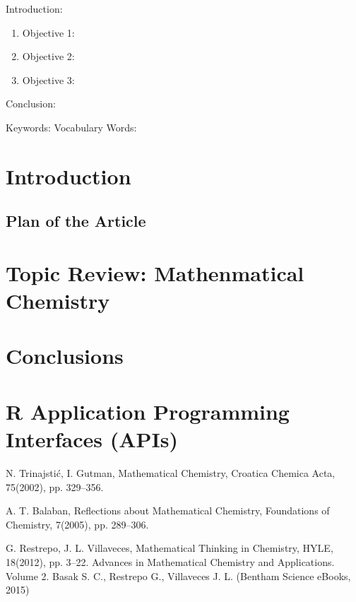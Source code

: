 

\twocolumn
\scriptsize
\begin{frontmatter}
		\title{}
		\author{}
		\address{The Mathematical Learning Space}
\end{frontmatter}	

Introduction:
\begin{enumerate}
\item Objective 1:
\item Objective 2:
\item Objective 3:
\end{enumerate}
Conclusion:

Keywords:
Vocabulary Words:

\section{Introduction}


\subsection{Plan of the Article}

\section{Topic Review: Mathenmatical Chemistry}


\section{Conclusions}


\section{R Application Programming Interfaces (APIs)}





\begin{thebibliography}{00}

N. Trinajstić, I. Gutman, 
\newblock Mathematical Chemistry, 
\newblock Croatica Chemica Acta, 75(2002), pp. 329–356.

A. T. Balaban, 
\newblock Reflections about Mathematical Chemistry, 
\newblock Foundations of Chemistry, 7(2005), pp. 289–306.

G. Restrepo, J. L. Villaveces, 
\newblock Mathematical Thinking in Chemistry, HYLE, 18(2012), pp. 3–22.
\newblock Advances in Mathematical Chemistry and Applications. Volume 2. Basak S. C., Restrepo G., Villaveces J. L. (Bentham Science eBooks, 2015)

\end{thebibliography}

